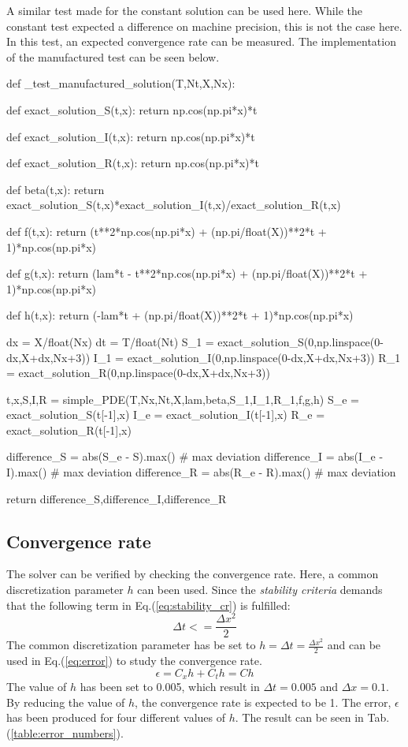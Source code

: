 \documentclass[%
twoside,                 %
final,                   %
chapterprefix=true,      %
open=right               %
10pt]{book}
\begin{document}
A similar test made for the constant solution can be used here. While the constant test expected a difference on machine precision, this is not the case here. In this test, an expected convergence rate can be measured. The implementation of the manufactured test can be seen below.

\bpycod
def _test_manufactured_solution(T,Nt,X,Nx):
    
    def exact_solution_S(t,x):
        return np.cos(np.pi*x)*t

    def exact_solution_I(t,x):
        return np.cos(np.pi*x)*t

    def exact_solution_R(t,x):
        return np.cos(np.pi*x)*t


    def beta(t,x):
        return exact_solution_S(t,x)*exact_solution_I(t,x)/exact_solution_R(t,x)
   
    def f(t,x):
        return (t**2*np.cos(np.pi*x) + (np.pi/float(X))**2*t + 1)*np.cos(np.pi*x) 

    def g(t,x):
        return (lam*t - t**2*np.cos(np.pi*x) + (np.pi/float(X))**2*t + 1)*np.cos(np.pi*x)

    def h(t,x):
        return (-lam*t + (np.pi/float(X))**2*t + 1)*np.cos(np.pi*x)
        

    dx = X/float(Nx)
    dt = T/float(Nt)
    S_1 = exact_solution_S(0,np.linspace(0-dx,X+dx,Nx+3))
    I_1 = exact_solution_I(0,np.linspace(0-dx,X+dx,Nx+3))
    R_1 = exact_solution_R(0,np.linspace(0-dx,X+dx,Nx+3))
     
    t,x,S,I,R = simple_PDE(T,Nx,Nt,X,lam,beta,S_1,I_1,R_1,f,g,h)
    S_e = exact_solution_S(t[-1],x)
    I_e = exact_solution_I(t[-1],x)
    R_e = exact_solution_R(t[-1],x)
    
    difference_S = abs(S_e - S).max()  # max deviation
    difference_I = abs(I_e - I).max()  # max deviation
    difference_R = abs(R_e - R).max()  # max deviation

    return difference_S,difference_I,difference_R
\epycod

\subsection{Convergence rate}
The solver can be verified by checking the convergence rate. Here, a common discretization parameter $h$ can been used. Since the \emph{stability criteria} demands that the following term in Eq.(\ref{eq:stability_cr}) is fulfilled: 
\begin{equation} \label{eq:stability_cr}
 \Delta t <= \frac{\Delta x^2}{2}
\end{equation}
The common discretization parameter has be set to $h=\Delta t = \frac{\Delta x^2}{2}$ and can be used in Eq.(\ref{eq:error}) to study the convergence rate.
\begin{equation} \label{eq:error}
    \epsilon = C_x h + C_t h = C h
\end{equation}
The value of $h$ has been set to 0.005, which result in $\Delta t = 0.005$ and $\Delta x=0.1$. By reducing the value of $h$, the convergence rate is expected to be 1. The error, $\epsilon$ has been produced for four different values of $h$. The result can be seen in Tab.(\ref{table:error_numbers}).  
\label{table:error_numbers}
\end{document}
